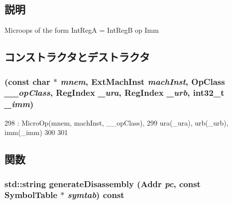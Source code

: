 \subsection{説明}
Microops of the form IntRegA = IntRegB op Imm 

\subsection{コンストラクタとデストラクタ}
\hypertarget{classArmISA_1_1MicroIntImmOp_ac48b8ef4688144851e7cef3b098d573b}{
\subsubsection[{MicroIntImmOp}]{ (const char $\ast$ {\em mnem}, \/  {\bf ExtMachInst} {\em machInst}, \/  OpClass {\em \_\-\_\-opClass}, \/  {\bf RegIndex} {\em \_\-ura}, \/  {\bf RegIndex} {\em \_\-urb}, \/  int32\_\-t {\em \_\-imm})}}
\label{classArmISA_1_1MicroIntImmOp_ac48b8ef4688144851e7cef3b098d573b}



\begin{DoxyCode}
298             : MicroOp(mnem, machInst, __opClass),
299               ura(_ura), urb(_urb), imm(_imm)
300     {
301     }
\end{DoxyCode}


\subsection{関数}
\hypertarget{classArmISA_1_1MicroIntImmOp_a95d323a22a5f07e14d6b4c9385a91896}{
\subsubsection[{generateDisassembly}]{\setlength{\rightskip}{0pt plus 5cm}std::string generateDisassembly ({\bf Addr} {\em pc}, \/  const SymbolTable $\ast$ {\em symtab}) const}}
\label{classArmISA_1_1MicroIntImmOp_a95d323a22a5f07e14d6b4c9385a91896}


